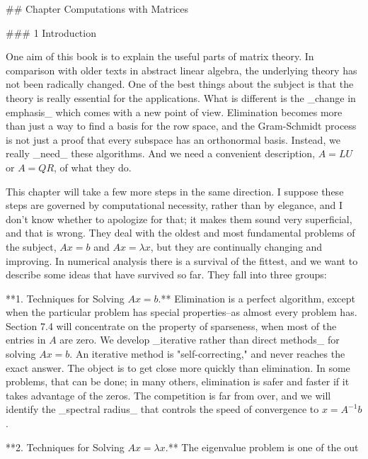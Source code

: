 

## Chapter Computations with Matrices

### 1 Introduction

One aim of this book is to explain the useful parts of matrix theory. In comparison with older texts in abstract linear algebra, the underlying theory has not been radically changed. One of the best things about the subject is that the theory is really essential for the applications. What is different is the _change in emphasis_ which comes with a new point of view. Elimination becomes more than just a way to find a basis for the row space, and the Gram-Schmidt process is not just a proof that every subspace has an orthonormal basis. Instead, we really _need_ these algorithms. And we need a convenient description, \(A=LU\) or \(A=QR\), of what they do.

This chapter will take a few more steps in the same direction. I suppose these steps are governed by computational necessity, rather than by elegance, and I don't know whether to apologize for that; it makes them sound very superficial, and that is wrong. They deal with the oldest and most fundamental problems of the subject, \(Ax=b\) and \(Ax=\lambda x\), but they are continually changing and improving. In numerical analysis there is a survival of the fittest, and we want to describe some ideas that have survived so far. They fall into three groups:

**1. Techniques for Solving \(Ax=b\).**  Elimination is a perfect algorithm, except when the particular problem has special properties--as almost every problem has. Section 7.4 will concentrate on the property of sparseness, when most of the entries in \(A\) are zero. We develop _iterative rather than direct methods_ for solving \(Ax=b\). An iterative method is "self-correcting," and never reaches the exact answer. The object is to get close more quickly than elimination. In some problems, that can be done; in many others, elimination is safer and faster if it takes advantage of the zeros. The competition is far from over, and we will identify the _spectral radius_ that controls the speed of convergence to \(x=A^{-1}b\).

**2. Techniques for Solving \(Ax=\lambda x\).**  The eigenvalue problem is one of the out